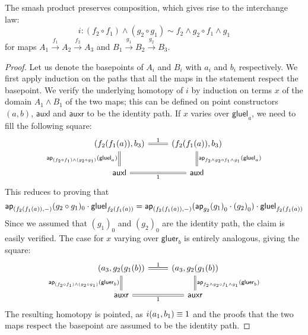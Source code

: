 \documentclass{article}
\newcommand{\lpmap}{\xrightarrow}
\newcommand{\smsh}{\wedge}
\newcommand{\tr}{\cdot}
\renewcommand{\o}{\ensuremath{\circ}}
\newcommand{\auxl}{\mathsf{auxl}}
\newcommand{\auxr}{\mathsf{auxr}}
\newcommand{\gluel}{\mathsf{gluel}}
\newcommand{\gluer}{\mathsf{gluer}}
\begin{document}
\begin{lem}\label{lem:interchange}
	The smash product preserves composition, which gives rise to the interchange law:
    \[i:(f_2 \o f_1)\smsh (g_2 \o g_1) \sim f_2 \smsh g_2 \o f_1 \smsh g_1\]
    for maps $A_1\lpmap{f_1}A_2\lpmap{f_2}A_3$ and $B_1\lpmap{g_1}B_2\lpmap{g_2}B_3$.
\end{lem}
\begin{proof}
	Let us denote the basepoints of $A_i$ and $B_i$ with $a_i$ and $b_i$ respectively. We first apply induction on the paths that all the maps in the statement respect the basepoint. We verify the underlying homotopy of $i$ by induction on terms $x$ of the domain $A_1 \smsh B_1$ of the two maps; this can be defined on point constructors $(a,b)$, $\auxl$ and $\auxr$ to be the identity path. If $x$ varies over $\gluel_a$, we need to fill the following square:
	\begin{equation}\label{eq:i-gluel}
	\begin{tikzcd}
		(f_2(f_1(a)), b_3)
			\arrow[r,equals,"1"]
			\arrow[d,swap,equals,"\mapfunc{(f_2 \o f_1)\smsh (g_2 \o g_1)}(\gluel_a)"]
		& (f_2(f_1(a)), b_3)
			\arrow[d,equals,"\mapfunc{f_2 \smsh g_2 \o f_1 \smsh g_1}(\gluel_a)"]
		\\
		\auxl
			\arrow[r,swap,equals,"1"]
		&\auxl
	\end{tikzcd}
	\end{equation}
	This reduces to proving that
	\[\mapfunc{(f_2(f_1(a)),-)}(g_2\o g_1)_0 \tr \gluel_{f_2(f_1(a))} = \mapfunc{(f_2(f_1(a)),-)}(\mapfunc{g_2}{(g_1)}_0 \tr {(g_2)}_0) \tr \gluel_{f_2(f_1(a))}\]
	Since we assumed that ${(g_1)}_0$ and ${(g_2)}_0$ are the identity path, the claim is easily verified. The case for $x$ varying over $\gluer_b$ is entirely analogous, giving the square:
	\begin{equation}\label{eq:i-gluer}
	\begin{tikzcd}
		(a_3, g_2(g_1(b))
			\arrow[r,equals,"1"]
			\arrow[d,swap,equals,"\mapfunc{(f_2 \o f_1)\smsh (g_2 \o g_1)}(\gluer_b)"]
		& (a_3, g_2(g_1(b))
			\arrow[d,equals,"\mapfunc{f_2 \smsh g_2 \o f_1 \smsh g_1}(\gluer_b)"]
		\\
		\auxr
			\arrow[r,swap,equals,"1"]
		&\auxr
	\end{tikzcd}
	\end{equation}
	The resulting homotopy is pointed, as $i(a_1,b_1) \equiv 1$ and the proofs that the two maps respect the basepoint are assumed to be the identity path.
\end{proof}
\end{document}
